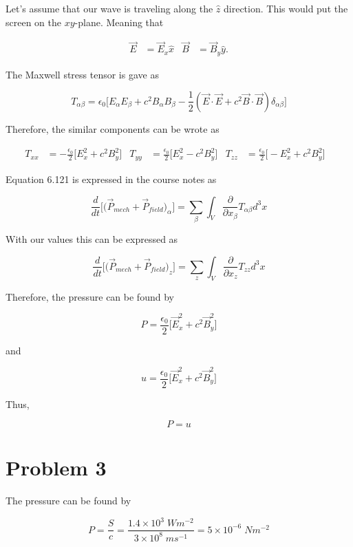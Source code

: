 \documentclass[11pt]{article}
\begin{document}
Let's assume that our wave is traveling along the $\hat{z}$ direction. This would put the screen on the $xy$-plane. Meaning that

\begin{align*}
    \vec{E} &= \vec{E}_{x}\hat{x} & \vec{B} &= \vec{B}_{y}\hat{y}.
\end{align*}

The Maxwell stress tensor is gave as

$$
T_{\alpha \beta} = \epsilon_{0}\Bigg[E_{\alpha}E_{\beta} + c^{2}B_{\alpha}B_{\beta} - \frac{1}{2} (\vec{E} \cdot \vec{E} + c^{2}\vec{B} \cdot \vec{B}) \delta_{\alpha \beta} \Bigg]
$$

Therefore, the similar components can be wrote as

\begin{align*}
    T_{xx} & = -\frac{\epsilon_{0}}{2}\Bigg[ E_{x}^{2} + c^{2}B_{y}^{2}\Bigg] &  
    T_{yy} & = \frac{\epsilon_{0}}{2}\Bigg[ E_{x}^{2} - c^{2}B_{y}^{2}\Bigg] &
    T_{zz} & = \frac{\epsilon_{0}}{2}\Bigg[ -E_{x}^{2} + c^{2}B_{y}^{2}\Bigg] &
\end{align*}

Equation 6.121 is expressed in the course notes as

$$
\frac{d}{dt}\Bigg[\Bigg(\vec{P}_{mech} + \vec{P}_{field}\Bigg)_{\alpha}\Bigg] = \sum_{\beta} \int_{V} \frac{\partial}{\partial x_{\beta}} T_{\alpha \beta} d^{3}x
$$

With our values this can be expressed as

$$
\frac{d}{dt}\Bigg[\Bigg(\vec{P}_{mech} + \vec{P}_{field}\Bigg)_{z}\Bigg] = \sum_{z} \int_{V} \frac{\partial}{\partial x_{z}} T_{zz} d^{3}x
$$

Therefore, the pressure can be found by

$$
P = \frac{\epsilon_{0}}{2}\Big[\vec{E}_{x}^{2} + c^{2}\vec{B}_{y}^{2}]
$$

and 

$$
u = \frac{\epsilon_{0}}{2}\Big[\vec{E}_{x}^{2} + c^{2}\vec{B}_{y}^{2}]
$$

Thus, 

$$
P = u
$$

\clearpage

\section*{Problem 3}

The pressure can be found by

$$
P = \frac{S}{c} = \frac{1.4\times10^{3} \; Wm^{-2}}{3\times10^{8} \; ms^{-1}} = 5\times10^{-6} \; Nm^{-2}
$$
\end{document}
